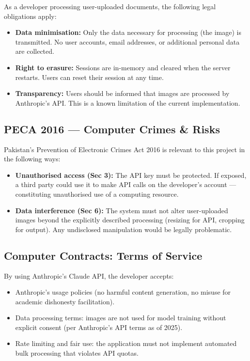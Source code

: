 \documentclass[12pt,a4paper]{article}
\begin{document}
As a developer processing user-uploaded documents, the following legal obligations apply:

\begin{itemize}[noitemsep]
  \item \textbf{Data minimisation:} Only the data necessary for processing (the image) is
    transmitted. No user accounts, email addresses, or additional personal data are collected.
  \item \textbf{Right to erasure:} Sessions are in-memory and cleared when the server restarts.
    Users can reset their session at any time.
  \item \textbf{Transparency:} Users should be informed that images are processed by Anthropic's
    API. This is a known limitation of the current implementation.
\end{itemize}

\subsection{PECA 2016 — Computer Crimes \& Risks}

Pakistan's Prevention of Electronic Crimes Act 2016 is relevant to this project in the
following ways:

\begin{itemize}[noitemsep]
  \item \textbf{Unauthorised access (Sec 3):} The API key must be protected. If exposed, a
    third party could use it to make API calls on the developer's account — constituting
    unauthorised use of a computing resource.
  \item \textbf{Data interference (Sec 6):} The system must not alter user-uploaded images
    beyond the explicitly described processing (resizing for API, cropping for output). Any
    undisclosed manipulation would be legally problematic.
\end{itemize}

\subsection{Computer Contracts: Terms of Service}

By using Anthropic's Claude API, the developer accepts:
\begin{itemize}[noitemsep]
  \item Anthropic's usage policies (no harmful content generation, no misuse for academic
    dishonesty facilitation).
  \item Data processing terms: images are not used for model training without explicit consent
    (per Anthropic's API terms as of 2025).
  \item Rate limiting and fair use: the application must not implement automated bulk processing
    that violates API quotas.
\end{itemize}
\end{document}
